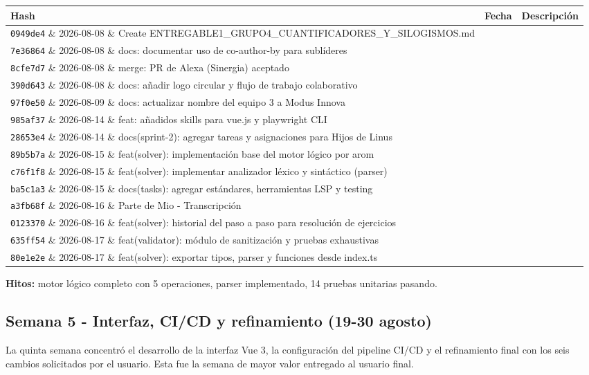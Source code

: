\documentclass[11pt,a4paper]{article}
\begin{document}
\begin{table}[htbp]
\centering
\small
\begin{tabularx}{\textwidth}{llX}
\toprule
\textbf{Hash} & \textbf{Fecha} & \textbf{Descripción} \\
\midrule
\texttt{0949de4} \& 2026-08-08 \& Create ENTREGABLE1\_GRUPO4\_CUANTIFICADORES\_Y\_SILOGISMOS.md \\
\texttt{7e36864} \& 2026-08-08 \& docs: documentar uso de co-author-by para sublíderes \\
\texttt{8cfe7d7} \& 2026-08-08 \& merge: PR de Alexa (Sinergia) aceptado \\
\texttt{390d643} \& 2026-08-08 \& docs: añadir logo circular y flujo de trabajo colaborativo \\
\texttt{97f0e50} \& 2026-08-09 \& docs: actualizar nombre del equipo 3 a Modus Innova \\
\texttt{985af37} \& 2026-08-14 \& feat: añadidos skills para vue.js y playwright CLI \\
\texttt{28653e4} \& 2026-08-14 \& docs(sprint-2): agregar tareas y asignaciones para Hijos de Linus \\
\texttt{89b5b7a} \& 2026-08-15 \& feat(solver): implementación base del motor lógico por arom \\
\texttt{c76f1f8} \& 2026-08-15 \& feat(solver): implementar analizador léxico y sintáctico (parser) \\
\texttt{ba5c1a3} \& 2026-08-15 \& docs(tasks): agregar estándares, herramientas LSP y testing \\
\texttt{a3fb68f} \& 2026-08-16 \& Parte de Mio - Transcripción \\
\texttt{0123370} \& 2026-08-16 \& feat(solver): historial del paso a paso para resolución de ejercicios \\
\texttt{635ff54} \& 2026-08-17 \& feat(validator): módulo de sanitización y pruebas exhaustivas \\
\texttt{80e1e2e} \& 2026-08-17 \& feat(solver): exportar tipos, parser y funciones desde index.ts \\
\bottomrule
\end{tabularx}
\end{table}
\textbf{Hitos:} motor lógico completo con 5 operaciones, parser implementado, 14 pruebas unitarias pasando.

\subsection{Semana 5 - Interfaz, CI/CD y refinamiento (19-30 agosto)}
La quinta semana concentró el desarrollo de la interfaz Vue 3, la configuración del pipeline CI/CD y el refinamiento final con los seis cambios solicitados por el usuario. Esta fue la semana de mayor valor entregado al usuario final.
\end{document}
